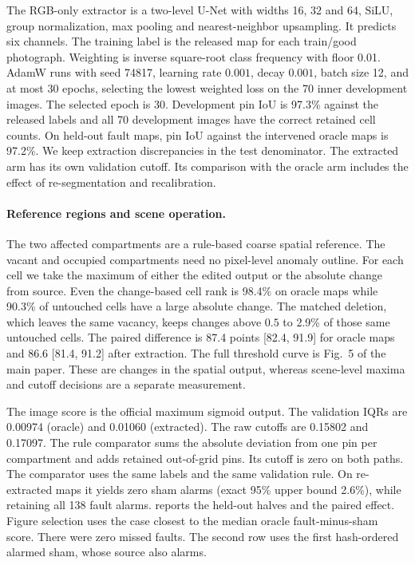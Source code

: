 \documentclass[10pt,twocolumn,letterpaper]{article}
\begin{document}
The RGB-only extractor is a two-level U-Net with widths 16, 32 and 64, SiLU, group normalization, max pooling and nearest-neighbor upsampling. It predicts six channels. The training label is the released map for each train/good photograph. Weighting is inverse square-root class frequency with floor 0.01. AdamW runs with seed 74817, learning rate $0.001$, decay $0.001$, batch size 12, and at most 30 epochs, selecting the lowest weighted loss on the 70 inner development images. The selected epoch is 30. Development pin IoU is 97.3\% against the released labels and all 70 development images have the correct retained cell counts. On held-out fault maps, pin IoU against the intervened oracle maps is 97.2\%. We keep extraction discrepancies in the test denominator. The extracted arm has its own validation cutoff. Its comparison with the oracle arm includes the effect of re-segmentation and recalibration.


\paragraph{Reference regions and scene operation.}
The two affected compartments are a rule-based coarse spatial reference. The vacant and occupied compartments need no pixel-level anomaly outline. For each cell we take the maximum of either the edited output or the absolute change from source. Even the change-based cell rank is 98.4\% on oracle maps while 90.3\% of untouched cells have a large absolute change. The matched deletion, which leaves the same vacancy, keeps changes above $0.5$ to 2.9\% of those same untouched cells. The paired difference is 87.4 points [82.4, 91.9] for oracle maps and 86.6 [81.4, 91.2] after extraction. The full threshold curve is Fig.~5 of the main paper. These are changes in the spatial output, whereas scene-level maxima and cutoff decisions are a separate measurement.

The image score is the official maximum sigmoid output. The validation IQRs are 0.00974 (oracle) and 0.01060 (extracted). The raw cutoffs are 0.15802 and 0.17097. The rule comparator sums the absolute deviation from one pin per compartment and adds retained out-of-grid pins. Its cutoff is zero on both paths. The comparator uses the same labels and the same validation rule. On re-extracted maps it yields zero sham alarms (exact 95\% upper bound 2.6\%), while retaining all 138 fault alarms.  reports the held-out halves and the paired effect. Figure selection uses the case closest to the median oracle fault-minus-sham score. There were zero missed faults. The second row uses the first hash-ordered alarmed sham, whose source also alarms.
\end{document}
